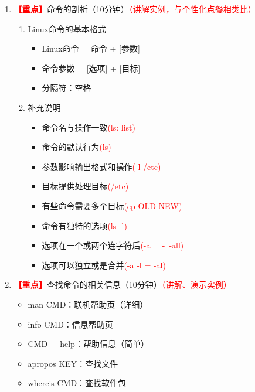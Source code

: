 \documentclass{TIJMUjiaoanLL}
\begin{document}
\begin{enumerate}
  \item \textcolor{red}{\textbf{【重点】}}命令的剖析（10分钟）\textcolor{red}{（讲解实例，与个性化点餐相类比）}
    \begin{enumerate}
      \item Linux命令的基本格式
	\begin{itemize}
	  \item Linux命令 = 命令 + [参数]
	  \item 命令参数 = [选项] + [目标]
	  \item 分隔符：空格
	\end{itemize}
      \item 补充说明
	\vspace*{-10pt}
	\begin{multicols}{2}
	\begin{itemize}
	  \item 命令名与操作一致\textcolor{red}{(ls: list)}
	  \item 命令的默认行为\textcolor{red}{(ls)}
	  \item 参数影响输出格式和操作\textcolor{red}{(-l /etc)}
	  \item 目标提供处理目标\textcolor{red}{(/etc)}
	  \item 有些命令需要多个目标\textcolor{red}{(cp OLD NEW)}
	  \item 命令有独特的选项\textcolor{red}{(ls -l)}
	  \item 选项在一个或两个连字符后\textcolor{red}{(-a = -\ -all)}
	  \item 选项可以独立或是合并\textcolor{red}{(-a -l = -al)}
	\end{itemize}
      \end{multicols}
	\vspace*{-10pt}
    \end{enumerate}

  \item \textcolor{red}{\textbf{【重点】}}查找命令的相关信息（10分钟）\textcolor{red}{（讲解、演示实例）}
      \begin{itemize}
	\item man CMD：联机帮助页（详细）
	\item info CMD：信息帮助页
	\item CMD -\ -help：帮助信息（简单）
	\item apropos KEY：查找文件
	\item whereis CMD：查找软件包
      \end{itemize}


\end{enumerate}
\end{document}
